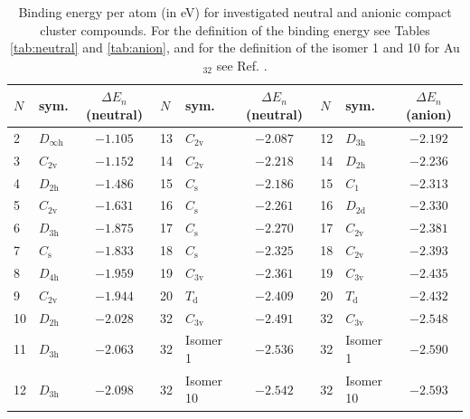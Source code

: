 \begin{table}[htbp]
	\centering
    \setlength{\tabcolsep}{3pt}
    \footnotesize{
    \caption{Binding energy per atom (in eV) for investigated neutral and
    anionic compact cluster compounds. For the definition of the binding energy
    see Tables \ref{tab:neutral} and \ref{tab:anion}, and for the definition of
    the isomer 1 and 10 for Au$_{32}$ see Ref.
    \cite{Jalbout_LowSymmetryStructuresAu_2008}.}
	\label{tab:Aun}
	\begin{tabular}{llcllcllc}
		\toprule
		$N$  & sym.  & $\Delta E_n$(neutral) & $N$  & sym.  & $\Delta E_n$(neutral) & $N$  & sym.  & $\Delta E_n$(anion) \\
		\midrule
2  & $D_\mathrm{\infty h}$ & $-1.105$ & 13 & $C_\mathrm{2v}$ & $-2.087$ & 12 & $D_\mathrm{3h}$  & $-2.192$ \\
3  & $C_\mathrm{2v}$       & $-1.152$ & 14 & $C_\mathrm{2v}$ & $-2.218$ & 14 & $D_\mathrm{2h}$  & $-2.236$ \\
4  & $D_\mathrm{2h}$       & $-1.486$ & 15 & $C_\mathrm{s}$  & $-2.186$ & 15 & $C_\mathrm{1}$     & $-2.313$ \\
5  & $C_\mathrm{2v}$       & $-1.631$ & 16 & $C_\mathrm{s}$  & $-2.261$ & 16 & $D_\mathrm{2d}$  & $-2.330$ \\
6  & $D_\mathrm{3h}$       & $-1.875$ & 17 & $C_\mathrm{s}$  & $-2.270$ & 17 & $C_\mathrm{2v}$  & $-2.381$ \\
7  & $C_\mathrm{s}$        & $-1.833$ & 18 & $C_\mathrm{s}$  & $-2.325$ & 18 & $C_\mathrm{2v}$  & $-2.393$ \\
8  & $D_\mathrm{4h}$       & $-1.959$ & 19 & $C_\mathrm{3v}$ & $-2.361$ & 19 & $C_\mathrm{3v}$  & $-2.435$ \\
9  & $C_\mathrm{2v}$       & $-1.944$ & 20 & $T_\mathrm{d}$  & $-2.409$ & 20 & $T_\mathrm{d}$     & $-2.432$ \\
10 & $D_\mathrm{2h}$       & $-2.028$ & 32 & $C_\mathrm{3v}$ & $-2.491$ & 32 & $C_\mathrm{3v}$  & $-2.548$ \\
11 & $D_\mathrm{3h}$       & $-2.063$ & 32 & Isomer 1        & $-2.536$ & 32 & Isomer 1  & $-2.590$ \\
12 & $D_\mathrm{3h}$       & $-2.098$ & 32 & Isomer 10       & $-2.542$ & 32 & Isomer 10 & $-2.593$ \\
		\bottomrule
    \end{tabular}}
\end{table}


